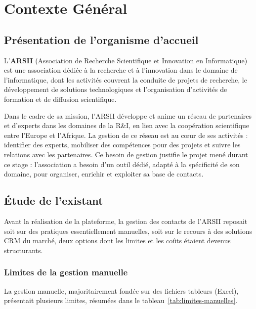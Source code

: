 
\chapter{Contexte Général}

\section{Présentation de l'organisme d'accueil}

L'\textbf{ARSII} (Association de Recherche Scientifique et Innovation en Informatique) est une association dédiée à la recherche et à l'innovation dans le domaine de l'informatique, dont les activités couvrent la conduite de projets de recherche, le développement de solutions technologiques et l'organisation d'activités de formation et de diffusion scientifique.

Dans le cadre de sa mission, l'ARSII développe et anime un réseau de partenaires et d'experts dans les domaines de la R\&I, en lien avec la coopération scientifique entre l'Europe et l'Afrique. La gestion de ce réseau est au cœur de ses activités : identifier des experts, mobiliser des compétences pour des projets et suivre les relations avec les partenaires. Ce besoin de gestion justifie le projet mené durant ce stage : l'association a besoin d'un outil dédié, adapté à la spécificité de son domaine, pour organiser, enrichir et exploiter sa base de contacts.

\section{Étude de l'existant}

Avant la réalisation de la plateforme, la gestion des contacts de l'ARSII reposait soit sur des pratiques essentiellement manuelles, soit sur le recours à des solutions CRM du marché, deux options dont les limites et les coûts étaient devenus structurants.

\subsection{Limites de la gestion manuelle}

La gestion manuelle, majoritairement fondée sur des fichiers tableurs (Excel), présentait plusieurs limites, résumées dans le tableau~\ref{tab:limites-manuelles}.

